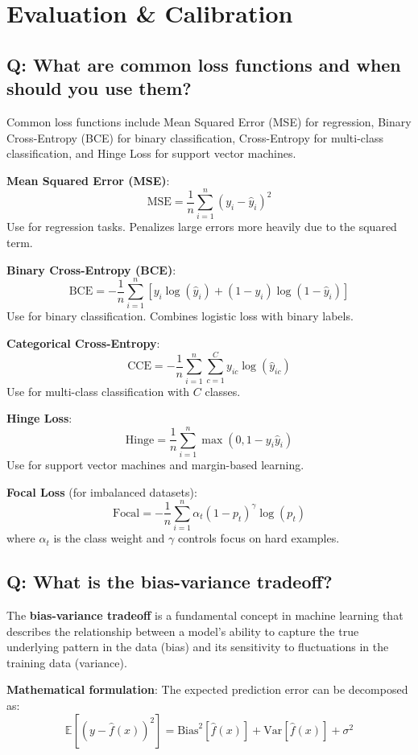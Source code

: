 \section{Evaluation \& Calibration}

\subsection*{Q: What are common loss functions and when should you use them?}
Common loss functions include Mean Squared Error (MSE) for regression, Binary Cross-Entropy (BCE) for binary classification, Cross-Entropy for multi-class classification, and Hinge Loss for support vector machines.

\textbf{Mean Squared Error (MSE)}:
\[
\text{MSE} = \frac{1}{n} \sum_{i=1}^{n} (y_i - \hat{y}_i)^2
\]
Use for regression tasks. Penalizes large errors more heavily due to the squared term.

\textbf{Binary Cross-Entropy (BCE)}:
\[
\text{BCE} = -\frac{1}{n} \sum_{i=1}^{n} [y_i \log(\hat{y}_i) + (1-y_i) \log(1-\hat{y}_i)]
\]
Use for binary classification. Combines logistic loss with binary labels.

\textbf{Categorical Cross-Entropy}:
\[
\text{CCE} = -\frac{1}{n} \sum_{i=1}^{n} \sum_{c=1}^{C} y_{ic} \log(\hat{y}_{ic})
\]
Use for multi-class classification with \(C\) classes.

\textbf{Hinge Loss}:
\[
\text{Hinge} = \frac{1}{n} \sum_{i=1}^{n} \max(0, 1 - y_i \hat{y}_i)
\]
Use for support vector machines and margin-based learning.

\textbf{Focal Loss} (for imbalanced datasets):
\[
\text{Focal} = -\frac{1}{n} \sum_{i=1}^{n} \alpha_t (1-p_t)^\gamma \log(p_t)
\]
where \(\alpha_t\) is the class weight and \(\gamma\) controls focus on hard examples.

\subsection*{Q: What is the bias-variance tradeoff?}
The \textbf{bias-variance tradeoff} is a fundamental concept in machine learning that describes the relationship between a model's ability to capture the true underlying pattern in the data (bias) and its sensitivity to fluctuations in the training data (variance).

\textbf{Mathematical formulation}:
The expected prediction error can be decomposed as:
\[
\mathbb{E}[(y - \hat{f}(x))^2] = \text{Bias}^2[\hat{f}(x)] + \text{Var}[\hat{f}(x)] + \sigma^2
\]

